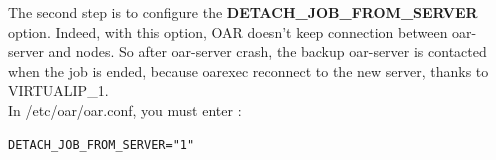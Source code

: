 \documentclass[a4paper,10pt]{report}
\begin{document}
The second step is to configure the \textbf{DETACH\_JOB\_FROM\_SERVER} option. Indeed, with this option, OAR doesn't keep connection between oar-server and nodes.
So after oar-server crash, the backup oar-server is contacted when the job is ended, because oarexec reconnect to the new server, thanks to VIRTUALIP\_1.\\
In /etc/oar/oar.conf, you must enter :
\begin{lstlisting}
DETACH_JOB_FROM_SERVER="1"
\end{lstlisting}





\begin{figure}[!h]
  \centering

\end{figure}
\end{document}
